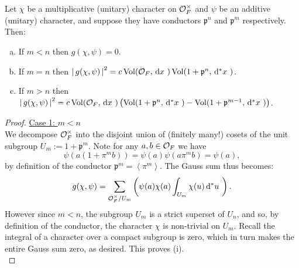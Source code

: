 \documentclass[11pt, x11names]{article}
\newcommand{\pp}{\mathfrak{p}}
\newcommand{\brangle}[1]{\left\langle #1 \right\rangle}
\renewcommand{\brack}[1]{\left(   #1 \right)}
\newcommand{\abs}[1]{\left| \, #1  \,\right|}
\newcommand{\dx}{\, \mathrm{d}x \ }
\renewcommand{\d}[1]{\, \mathrm{d}#1 \ }
\DeclareMathOperator{\vol}{Vol}
\begin{document}
\begin{lemma}
\label{lemma: gauss-sum conductor relations}
Let $\chi$ be a multiplicative (unitary) character on $\mathcal{O}_F^\times$ and $\psi$ be an additive (unitary) character, and suppose they have conductors $\pp^n$ and $\pp^m$ respectively. Then:
\begin{enumerate}[(a)]
    \item If $m < n$ then $g(\chi, \psi) = 0$.
    \item If $m = n$ then $\abs{g(\chi, \psi)}^2 = c \vol(\calo_F, \dx) \vol(1 + \pp^n, \d{^*x})$.
    \item If $m > n$ then $\abs{g(\chi, \psi)}^2 = c \vol(\calo_F, \dx) \brack{\vol(1 + \pp^n, \d{^*x}) - \vol(1 + \pp^{m-1}, \d{^*x})}$.
\end{enumerate}
\end{lemma}
\begin{proof}
\underline{Case 1: $m < n$}\\
We decompose $\mathcal{O}_F^\times$ into the disjoint union of (finitely many!) cosets of the unit subgroup $U_m := 1 + \pp^m$. Note for any $a, b \in \mathcal{O}_F$ we have
\begin{equation*}
    \psi(a(1 + \pi^m b)) = \psi(a) \psi(a\pi^m b) = \psi(a),
\end{equation*}
by definition of the conductor $\pp^m = \brangle{\pi^m}$. The Gauss sum thus becomes:
\begin{equation*}
    g(\chi, \psi) = \sum_{\calo_F^\times/U_m} \brack{\psi(a) \chi(a) \int_{U_m} \chi(u) \d{^*u}}.
\end{equation*}
However since $m < n$, the subgroup $U_m$ is a strict superset of $U_n$, and so, by definition of the conductor, the character $\chi$ is non-trivial on $U_m$. Recall the integral of a character over a compact subgroup is zero, which in turn makes the entire Gauss sum zero, as desired. This proves (i).\\


\end{proof}
\end{document}
